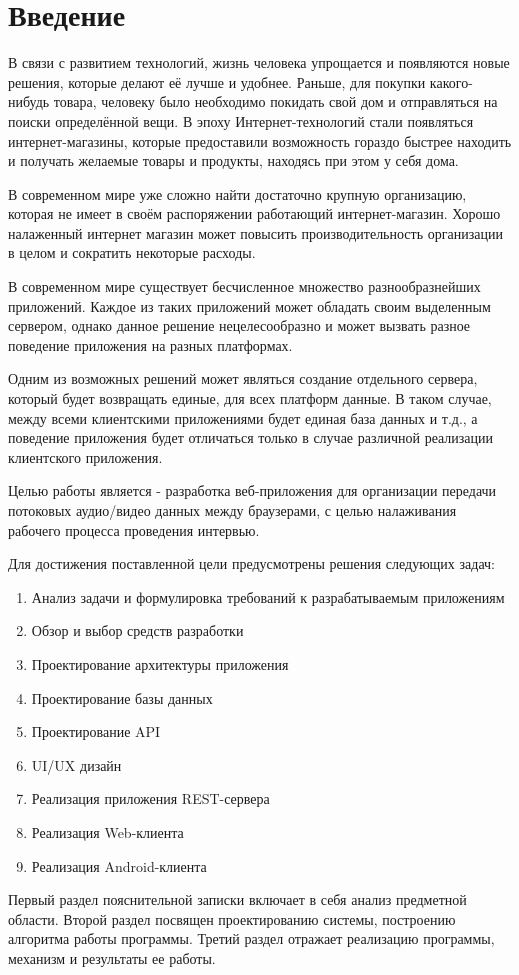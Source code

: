 \label{sec:intro}
\section*{Введение}\indent

В связи с развитием технологий, жизнь человека упрощается и появляются новые решения, которые делают её лучше и удобнее. Раньше, для покупки какого-нибудь товара, человеку было необходимо покидать свой дом и отправляться на поиски определённой вещи. В эпоху Интернет-технологий стали появляться интернет-магазины, которые предоставили возможность гораздо быстрее находить и получать желаемые товары и продукты, находясь при этом у себя дома.

В современном мире уже сложно найти достаточно крупную организацию, которая не имеет в своём распоряжении работающий интернет-магазин. Хорошо налаженный интернет магазин может повысить производительность организации в целом и сократить некоторые расходы.

В современном мире существует бесчисленное множество разнообразнейших приложений. Каждое из таких приложений может обладать своим выделенным сервером, однако данное решение нецелесообразно и может вызвать разное поведение приложения на разных платформах.

Одним из возможных решений может являться создание отдельного сервера, который будет возвращать единые, для всех платформ данные. В таком случае, между всеми клиентскими приложениями будет единая база данных и т.д., а поведение приложения будет отличаться только в случае различной реализации клиентского приложения.

Целью работы является - разработка веб-приложения для организации передачи потоковых аудио/видео данных между браузерами, с целью налаживания рабочего процесса проведения интервью.

Для достижения поставленной цели предусмотрены решения следующих задач:

\begin{enumerate}
    \item Анализ задачи и формулировка требований к разрабатываемым приложениям
    \item Обзор и выбор средств разработки
    \item Проектирование архитектуры приложения
    \item Проектирование базы данных
    \item Проектирование API
    \item UI/UX дизайн
    \item Реализация приложения REST-сервера
    \item Реализация Web-клиента
    \item Реализация Android-клиента
\end{enumerate}

Первый раздел пояснительной записки включает в себя анализ предметной области. Второй раздел посвящен проектированию системы, построению алгоритма работы программы. Третий раздел отражает реализацию программы, механизм и результаты ее работы.
